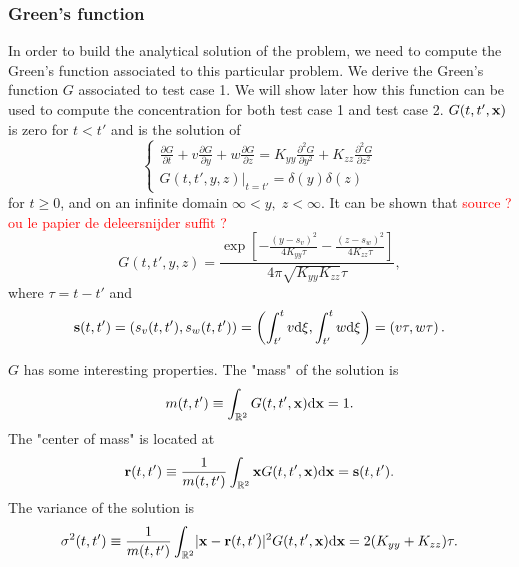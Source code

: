 \subsubsection{Green's function}
In order to build the analytical solution of the problem, we need to compute the Green's function associated to this particular problem. We derive the Green's function $G$ associated to test case 1. We will show later how this function can be used to compute the concentration for both test case 1 and test case 2. $\G$ is zero for $t<t'$ and is the solution of
\begin{equation} \label{eq:testcase_green}
	\begin{cases}
		\frac{\partial G}{\partial t} + v \frac{\partial G}{\partial y} + w\frac{\partial G}{\partial z} = K_{yy}\frac{\partial^2 G}{\partial y^2} + K_{zz}\frac{\partial^2 G}{\partial z^2}\\[.1cm]
		\left. G(t,t',y,z) \right \rvert_{t=t'} = \delta(y)\delta(z) 
	\end{cases}
\end{equation}
for $t \ge 0$, and on an infinite domain $\infty < y,\; z < \infty$. It can be shown that \textcolor{red}{source ? ou le papier de deleersnijder suffit ?}
\begin{equation} 
	G(t,t',y,z) = \frac{\exp\left[-\frac{(y-s_v)^2}{4K_{yy}\tau} -\frac{(z-s_w)^2}{4K_{zz}\tau} \right]}{4\pi\sqrt{K_{yy}K_{zz}}\tau},
\end{equation}
where $\tau = t-t'$ and 
\begin{equation}
	\b s(t,t') = (s_v(t,t'), s_w(t,t')) = \left(\int_{t'}^{t}v \rm d \xi, \int_{t'}^{t}w \rm d \xi \right) = \left(v\tau, w\tau\right).
\end{equation}

$G$ has some interesting properties. The "mass" of the solution is
\begin{equation} \label{eq:testcase:propmass}
	m(t,t') \equiv \int_{\R[2]} \G \rm d \b x = 1.
\end{equation}
The "center of mass" is located at
\begin{equation} \label{eq:testcase:propcenter}
	\b r(t,t') \equiv \frac{1}{m(t,t')} \int_{\R[2]} \b x \G \rm d \b x  = \b s(t,t').
\end{equation}
The variance of the solution is
\begin{equation} \label{eq:testcase:propvar}
	\sigma^2(t,t') \equiv \frac{1}{m(t,t')} \int_{\R[2]} \lvert \b x - \b r(t,t') \rvert^2 \G \rm d \b x = 2 (K_{yy}+K_{zz}) \tau.
\end{equation}

